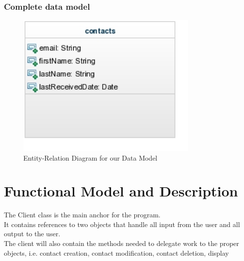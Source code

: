 \documentclass{article}
\begin{document}
\subsubsection{Complete data model}
\begin{figure}[H]
\centering
\includegraphics[width=90mm]{img/db_erd.jpg}
\caption{Entity-Relation Diagram for our Data Model \label{db_erd}}
\end{figure}


\section{Functional Model and Description}
\paragraph{}
The Client class is the main anchor for the program. \\
It contains references to two objects that handle all input from the user and all output to the user. \\
The client will also contain the methods needed to delegate work to the proper objects, i.e. contact creation, contact modification, contact deletion, display
\end{document}

